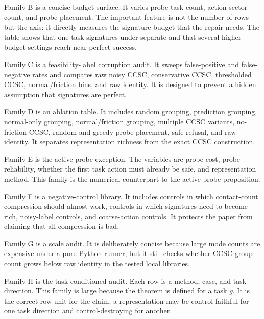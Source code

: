 \documentclass{article}
\begin{document}
Family B is a concise budget surface. It varies probe task count, action sector count, and probe placement. The important feature is not the number of rows but the axis: it directly measures the signature budget that the repair needs. The table shows that one-task signatures under-separate and that several higher-budget settings reach near-perfect success.

Family C is a feasibility-label corruption audit. It sweeps false-positive and false-negative rates and compares raw noisy CCSC, conservative CCSC, thresholded CCSC, normal/friction bins, and raw identity. It is designed to prevent a hidden assumption that signatures are perfect.

Family D is an ablation table. It includes random grouping, prediction grouping, normal-only grouping, normal/friction grouping, multiple CCSC variants, no-friction CCSC, random and greedy probe placement, safe refusal, and raw identity. It separates representation richness from the exact CCSC construction.

Family E is the active-probe exception. The variables are probe cost, probe reliability, whether the first task action must already be safe, and representation method. This family is the numerical counterpart to the active-probe proposition.

Family F is a negative-control library. It includes controls in which contact-count compression should almost work, controls in which signatures need to become rich, noisy-label controls, and coarse-action controls. It protects the paper from claiming that all compression is bad.

Family G is a scale audit. It is deliberately concise because large mode counts are expensive under a pure Python runner, but it still checks whether CCSC group count grows below raw identity in the tested local libraries.

Family H is the task-conditioned audit. Each row is a method, case, and task direction. This family is large because the theorem is defined for a task $g$. It is the correct row unit for the claim: a representation may be control-faithful for one task direction and control-destroying for another.
\end{document}

